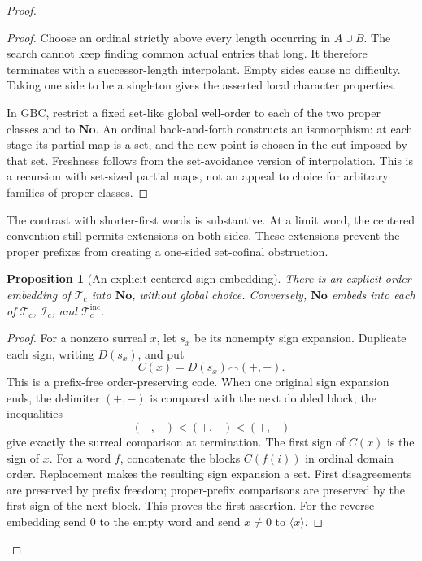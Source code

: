 \documentclass[11pt]{article}
\newtheorem{proposition}[proposition]{Proposition}
\theoremstyle{definition}
\theoremstyle{remark}
\newcommand{\No}{\mathbf{No}}
\newcommand{\Words}{\mathcal I}
\newcommand{\WordsAll}{\mathcal T}
\newcommand{\WordsInc}{\mathcal T^{\mathrm{inc}}}
\begin{document}
\begin{proof}
\begin{proof}
Choose an ordinal strictly above every length occurring in
\(A\cup B\).  The search cannot keep finding common actual entries
that long.  It therefore terminates with a successor-length
interpolant.  Empty sides cause no difficulty.  Taking one side to be
a singleton gives the asserted local character properties.

In \(\mathrm{GBC}\), restrict a fixed set-like global well-order to
each of the two proper classes and to \(\No\).  An ordinal
back-and-forth constructs an isomorphism: at each stage its partial
map is a set, and the new point is chosen in the cut imposed by that
set.  Freshness follows from the set-avoidance version of
interpolation.  This is a recursion with set-sized partial maps,
not an appeal to choice for arbitrary families of proper classes.
\end{proof}

The contrast with shorter-first words is substantive.  At a limit
word, the centered convention still permits extensions on both sides.
These extensions prevent the proper prefixes from creating a
one-sided set-cofinal obstruction.

\begin{proposition}[An explicit centered sign embedding]
\label{swo:sh:wv:centered-code}
There is an explicit order embedding of \(\WordsAll_c\) into \(\No\),
without global choice.  Conversely, \(\No\) embeds into each of
\(\WordsAll_c\), \(\Words_c\), and
\(\WordsInc_c\).
\end{proposition}

\begin{proof}
For a nonzero surreal \(x\), let \(s_x\) be its nonempty sign expansion.
Duplicate each sign, writing \(D(s_x)\), and put
\[
       C(x)=D(s_x)\mathbin{\frown}(+,-).
\]
This is a prefix-free order-preserving code.  When one original sign
expansion ends, the delimiter \((+,-)\) is compared with the next
doubled block; the inequalities
\[
                  (-,-)<(+,-)<(+,+)
\]
give exactly the surreal comparison at termination.  The first sign
of \(C(x)\) is the sign of \(x\).
For a word \(f\), concatenate the blocks \(C(f(i))\) in ordinal
domain order.  Replacement makes the resulting sign expansion a set.
First disagreements are preserved by prefix freedom; proper-prefix
comparisons are preserved by the first sign of the next block.
This proves the first assertion.
For the reverse embedding send \(0\) to the empty word and send
\(x\ne0\) to \(\langle x\rangle\).
\end{proof}


\end{proof}
\end{document}
